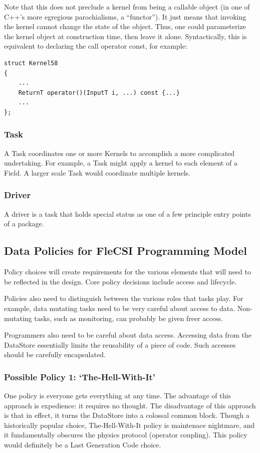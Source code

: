 Note that this does not preclude a kernel from being a callable object (in one of C++'s more egregious parochialisms, a ``functor'').
It just means that invoking the kernel cannot change the state of the object.
Thus, one could parameterize the kernel object at construction time, then leave it alone.
Syntactically, this is equivalent to declaring the call operator const, for example:
\begin{verbatim}
struct Kernel58
{
    ...
    ReturnT operator()(InputT i, ...) const {...}
    ...
};
\end{verbatim}

\subsubsection{Task}
A Task coordinates one or more Kernels to accomplish a more complicated undertaking.
For example, a Task might apply a kernel to each element of a Field.
A larger scale Task would coordinate multiple kernels.

\subsubsection{Driver}
A driver is a task that holds special status as one of a few principle entry points of a package.

\subsection{Data Policies for FleCSI Programming Model}
Policy choices will create requirements for the various elements that will need to be reflected in the design.
Core policy decisions include access and lifecycle.

Policies also need to distinguish between the various roles that tasks play.
For example, data mutating tasks need to be very careful about access to data.
Non-mutating tasks, such as monitoring, can probably be given freer access.

Programmers also need to be careful about data access.
Accessing data from the DataStore essentially limits the reusability of a piece of code.
Such accesses should be carefully encapsulated.

\subsubsection{Possible Policy 1: `The-Hell-With-It'}
One policy is everyone gets everything at any time.
The advantage of this approach is expedience: it requires no thought.
The disadvantage of this approach is that in effect, it turns the DataStore into a colossal common block.
Though a historically popular choice, The-Hell-With-It policy is maintenace nightmare, and it fundamentally obscures the physics protocol (operator coupling).
This policy would definitely be a Last Generation Code choice.


